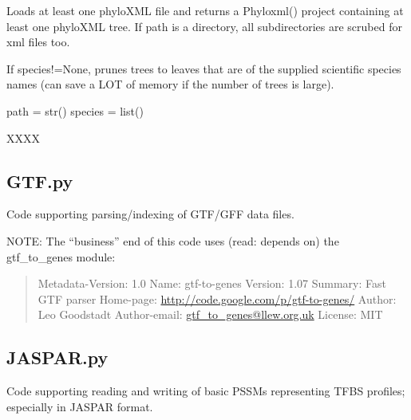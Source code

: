 \documentclass[letterpaper,10pt,english]{sphinxmanual}
\begin{document}

\begin{fulllineitems}
\label{code:gfunc.parsers.ETE.load_phyloXMLs}
Loads at least one phyloXML file and returns a Phyloxml() project containing at least one phyloXML tree.
If path is a directory, all subdirectories are scrubed for xml files too.

If species!=None, prunes trees to leaves that are of the supplied scientific species names (can save a LOT
of memory if the number of trees is large).

path = str()
species = list()

\end{fulllineitems}


\begin{fulllineitems}
\label{code:gfunc.parsers.ETE.prune_trees_by_species}
XXXX

\end{fulllineitems}

\label{code:module-gfunc.parsers.GTF}

\subsection{GTF.py}
\label{code:gtf-py}
Code supporting parsing/indexing of GTF/GFF data files.

NOTE: The ``business'' end of this code uses (read: depends on) the gtf\_to\_genes module:
\begin{quote}

Metadata-Version: 1.0
Name: gtf-to-genes
Version: 1.07
Summary: Fast GTF parser
Home-page: \href{http://code.google.com/p/gtf-to-genes/}{http://code.google.com/p/gtf-to-genes/}
Author: Leo Goodstadt
Author-email: \href{mailto:gtf\_to\_genes@llew.org.uk}{gtf\_to\_genes@llew.org.uk}
License: MIT
\end{quote}
\label{code:module-gfunc.parsers.JASPAR}

\subsection{JASPAR.py}
\label{code:jaspar-py}
Code supporting reading and writing of basic PSSMs representing TFBS profiles; especially in JASPAR format.
\end{document}
